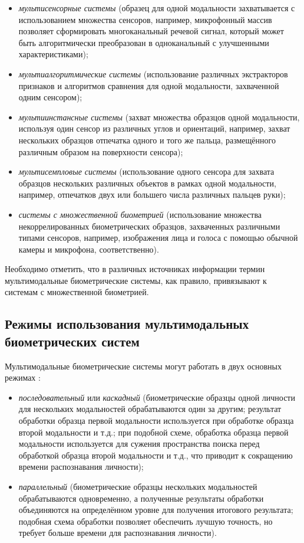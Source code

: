 \documentclass[12pt]{book}
\begin{document}
{{\begin{itemize}[topsep=1pt] \itemsep0.1em
\item \textit{мультисенсорные системы} (образец для одной модальности захватывается с использованием множества сенсоров, например, микрофонный массив позволяет сформировать многоканальный речевой сигнал, который может быть алгоритмически преобразован в одноканальный с улучшенными характеристиками);
\item \textit{мультиалгоритмические системы} (использование различных экстракторов признаков и алгоритмов сравнения для одной модальности, захваченной одним сенсором);
\item \textit{мультиинстансные системы} (захват множества образцов одной модальности, используя один сенсор из различных углов и ориентаций, например, захват нескольких образцов отпечатка одного и того же пальца, размещённого различным образом на поверхности сенсора);
\item \textit{мультисемпловые системы} (использование одного сенсора для захвата образцов нескольких различных объектов в рамках одной модальности, например, отпечатков двух или большего числа различных пальцев руки);
\item \textit{системы с множественной биометрией} (использование множества некоррелированных биометрических образцов, захваченных различными типами сенсоров, например, изображения лица и голоса с помощью обычной камеры и микрофона, соответственно).
\end{itemize}

Необходимо отметить, что в различных источниках информации термин мультимодальные биометрические системы, как правило, привязывают к системам с множественной биометрией.

}

\subsection{Режимы использования мультимодальных биометрических систем}

\large{Мультимодальные биометрические системы могут работать в двух основных режимах \cite{unar_2014}:

\begin{itemize}[topsep=1pt] \itemsep0.1em
\item \textit{последовательный} или \textit{каскадный} (биометрические образцы одной личности для нескольких модальностей обрабатываются один за другим; результат обработки образца первой модальности используется при обработке образца второй модальности и т.д.; при подобной схеме, обработка образца первой модальности используется для сужения пространства поиска перед обработкой образца второй модальности и т.д., что приводит к сокращению времени распознавания личности);
\item \textit{параллельный} (биометрические образцы нескольких модальностей обрабатываются одновременно, а полученные результаты обработки объединяются на определённом уровне для получения итогового результата; подобная схема обработки позволяет обеспечить лучшую точность, но требует больше времени для распознавания личности).
\end{itemize}

}}
\end{document}
